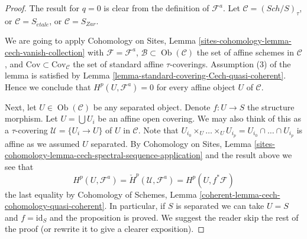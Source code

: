 \documentclass{stacks-project}
\theoremstyle{plain}
\theoremstyle{definition}
\theoremstyle{remark}
\numberwithin{equation}{subsection}
\def\Sch{\mathit{Sch}}
\def\Ob{\mathop{\mathrm{Ob}}\nolimits}
\def\etale{{\acute{e}tale}}
\begin{document}
\begin{proof}
The result for $q = 0$ is clear from the definition of $\mathcal{F}^a$.
Let $\mathcal{C} = (\Sch/S)_\tau$, or $\mathcal{C} = S_\etale$,
or $\mathcal{C} = S_{Zar}$.

\medskip\noindent
We are going to apply
Cohomology on Sites,
Lemma \ref{sites-cohomology-lemma-cech-vanish-collection}
with $\mathcal{F} = \mathcal{F}^a$,
$\mathcal{B} \subset \Ob(\mathcal{C})$ the set of affine schemes
in $\mathcal{C}$, and $\text{Cov} \subset \text{Cov}_\mathcal{C}$ the
set of standard affine $\tau$-coverings. Assumption (3) of
the lemma is satisfied by
Lemma \ref{lemma-standard-covering-Cech-quasi-coherent}.
Hence we conclude that $H^p(U, \mathcal{F}^a) = 0$ for every
affine object $U$ of $\mathcal{C}$.

\medskip\noindent
Next, let $U \in \Ob(\mathcal{C})$ be any separated object.
Denote $f : U \to S$ the structure morphism.
Let $U = \bigcup U_i$ be an affine open covering.
We may also think of this as a $\tau$-covering
$\mathcal{U} = \{U_i \to U\}$ of $U$ in $\mathcal{C}$.
Note that
$U_{i_0} \times_U \ldots \times_U U_{i_p} =
U_{i_0} \cap \ldots \cap U_{i_p}$ is affine as we assumed $U$ separated.
By
Cohomology on Sites, Lemma
\ref{sites-cohomology-lemma-cech-spectral-sequence-application}
and the result above we see that
$$
H^p(U, \mathcal{F}^a) = \check{H}^p(\mathcal{U}, \mathcal{F}^a)
= H^p(U, f^*\mathcal{F})
$$
the last equality by
Cohomology of Schemes, Lemma
\ref{coherent-lemma-cech-cohomology-quasi-coherent}.
In particular, if $S$ is separated we can take $U = S$ and
$f = \text{id}_S$ and the proposition is proved.
We suggest the reader skip the rest of the proof (or rewrite it
to give a clearer exposition).


\end{proof}
\end{document}
